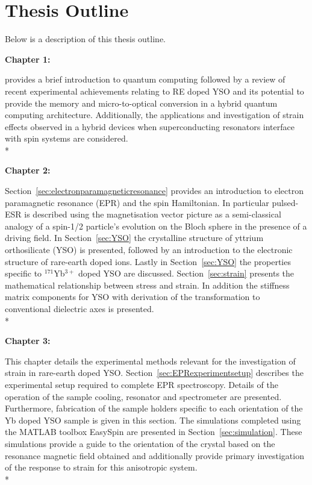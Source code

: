 \chapter{Thesis Outline}
\label{ch:Outline}
Below is a description of this thesis outline.
\par
\par
\noindent \textbf{Chapter 1:}{\addtolength{\leftskip}{5 mm} provides a brief introduction to quantum computing followed by a review of recent experimental achievements relating to RE doped YSO and its potential to provide the memory and micro-to-optical conversion in a hybrid quantum computing architecture. Additionally, the applications and investigation of strain effects observed in a hybrid devices when superconducting resonators interface with spin systems are considered. \\*

}

\noindent \textbf{Chapter 2:} {\addtolength{\leftskip}{5 mm}
Section~\ref{sec:electronparamagneticresonance} provides an introduction to electron paramagnetic resonance (EPR) and the spin Hamiltonian. In particular pulsed-ESR is described using the magnetisation vector picture as a semi-classical analogy of a spin-1/2 particle's evolution on the Bloch sphere in the presence of a driving field. In Section~\ref{sec:YSO} the crystalline structure of yttrium orthosilicate (YSO) is presented, followed by an introduction to the electronic structure of rare-earth doped ions. Lastly in Section~\ref{sec:YSO} the properties specific to $^{171}$Yb$^{3+}$ doped YSO are discussed. 
Section~\ref{sec:strain} presents the mathematical relationship between stress and strain. In addition the stiffness matrix components for YSO with derivation of the transformation to conventional dielectric axes is presented. \\*


}

\noindent \textbf{Chapter 3:} {\addtolength{\leftskip}{5 mm} This chapter details the experimental methods relevant for the investigation of strain in rare-earth doped YSO. Section~\ref{sec:EPRexperimentsetup} describes the experimental setup required to complete EPR spectroscopy. Details of the operation of the sample cooling, resonator and spectrometer are presented. Furthermore, fabrication of the sample holders specific to each orientation of the Yb doped YSO sample is given in this section. The simulations completed using the MATLAB toolbox EasySpin are presented in Section~\ref{sec:simulation}. These simulations provide a guide to the orientation of the crystal based on the resonance magnetic field obtained and additionally provide primary investigation of the response to strain for this anisotropic system. \\*


}

